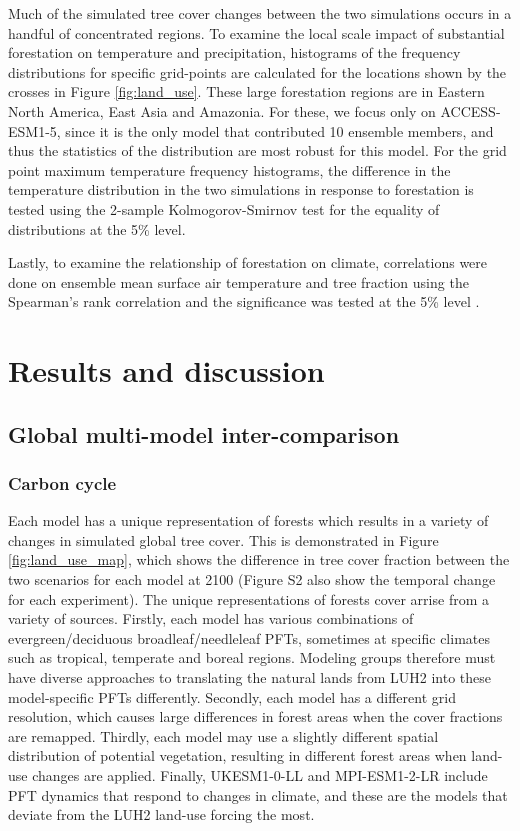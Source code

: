 \documentclass[draft]{agujournal2019}
\begin{document}
Much of the simulated tree cover changes between the two simulations occurs in a handful of concentrated regions.
To examine the local scale impact of substantial forestation on temperature and precipitation, histograms of the frequency distributions for specific grid-points are calculated for the locations shown by the crosses in Figure \ref{fig:land_use}.
These large forestation regions are in Eastern North America, East Asia and Amazonia.
For these, we focus only on ACCESS-ESM1-5, since it is the only model that contributed 10 ensemble members, and thus the statistics of the distribution are most robust for this model.
For the grid point maximum temperature frequency histograms, the difference in the temperature distribution in the two simulations in response to forestation is tested using the 2-sample Kolmogorov-Smirnov test for the equality of distributions at the 5\% level.

Lastly, to examine the relationship of forestation on climate, correlations were done on ensemble mean surface air temperature and tree fraction using the Spearman's rank correlation and the significance was tested at the 5\% level \cite{kokoska2000crc}.

\section{Results and discussion}

\subsection{Global multi-model inter-comparison}

\subsubsection{Carbon cycle}

Each model has a unique representation of forests which results in a variety of changes in simulated global tree cover.
This is demonstrated in Figure \ref{fig:land_use_map}, which shows the difference in tree cover fraction between the two scenarios for each model at 2100 (Figure S2 also show the temporal change for each experiment).
The unique representations of forests cover arrise from a variety of sources.
Firstly, each model has various combinations of evergreen/deciduous broadleaf/needleleaf PFTs, sometimes at specific climates such as tropical, temperate and boreal regions.
Modeling groups therefore must have diverse approaches to translating the natural lands from LUH2 into these model-specific PFTs differently.
Secondly, each model has a different grid resolution, which causes large differences in forest areas when the cover fractions are remapped.
Thirdly, each model may use a slightly different spatial distribution of potential vegetation, resulting in different forest areas when land-use changes are applied.
Finally, UKESM1-0-LL and MPI-ESM1-2-LR include PFT dynamics that respond to changes in climate, and these are the models that deviate from the LUH2 land-use forcing the most.
\end{document}
